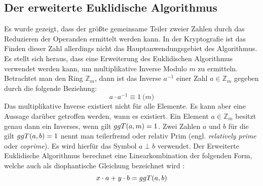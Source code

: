 \subsection{Der erweiterte Euklidische Algorithmus}
Es wurde gezeigt, dass der größte gemeinsame Teiler zweier Zahlen durch
das Reduzieren der Operanden ermittelt werden kann. In der Kryptografie ist
das Finden dieser Zahl allerdings nicht das Hauptanwendungsgebiet des
Algorithmus. Es stellt sich heraus, dass eine Erweiterung des Euklidischen Algorithmus
verwendet werden kann, um multiplikative Inverse Modulo $m$ zu ermitteln.
Betrachtet man den Ring $\mathbb{Z}_m$, dann ist das Inverse $a^{-1}$
einer Zahl $a \in \mathbb{Z}_m$ gegeben durch die folgende Beziehung:
\begin{equation}
  \label{eq:inverse}
  a \cdot a^{-1} \equiv 1 \pod{m}
\end{equation}
Das multiplikative Inverse existiert nicht für alle Elemente. Es kann aber eine Aussage
darüber getroffen werden, wann es existiert. Ein Element
$a \in \mathbb{Z}_m$ besitzt genau dann ein Inverses, wenn gilt $ggT(a,m) = 1$.
Zwei Zahlen $a$ und $b$ für die gilt $ggT(a,b) = 1$ nennt man teilerfremd oder
relativ Prim (engl. \textit{relatively prime} oder \textit{coprime}).
Es wird hierfür das Symbol $a \perp b$ verwendet.
Der Erweiterte Euklidische Algorithmus berechnet eine Linearkombination der folgenden Form,
welche auch als diophantische Gleichung
bezeichnet wird \parencite[160]{BOOK:crypto} \parencite{SITE:diophant}:
\begin{equation}
  x \cdot a + y \cdot b = ggT(a,b)
\end{equation}

